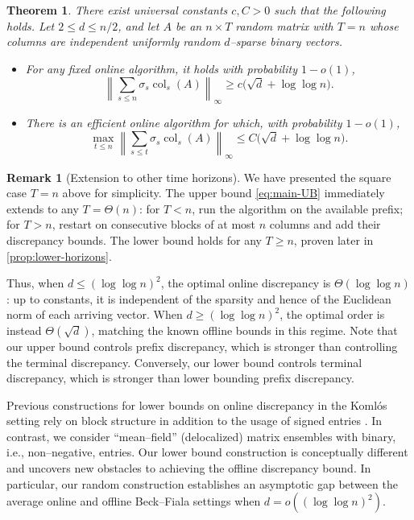 \documentclass[reqno,english]{amsart}
\newcommand*{\col}{\operatorname{col}}
\newtheorem{theorem}{Theorem}[section]
\theoremstyle{definition}
\newtheorem{remark}[remark]{Remark}
\begin{document}
\begin{theorem}\label{thm:main}
There exist universal constants $c,C > 0$ such that the following holds. Let $2\le d\le n/2$, and let $A$ be an $n\times T$ random matrix with $T = n$ whose columns are
independent uniformly random $d$--sparse binary vectors.
\begin{itemize}
    \item For any fixed online algorithm, it holds with probability $1-o(1)$,
    \begin{equation}\label{eq:main-LB}
        \left\|\sum_{s\le n}\sigma_s\col_s(A)\right\|_\infty
        \ge c\big(\sqrt d+\log\log n\big).
    \end{equation}
    \item There is an efficient online algorithm for which, with probability
    $1-o(1)$,
    \begin{equation}\label{eq:main-UB}
        \max_{t\le n}\left\|\sum_{s\le t}\sigma_s\col_s(A)\right\|_\infty
        \le C\big(\sqrt d+\log\log n\big).
    \end{equation}
\end{itemize}
\end{theorem}

\begin{remark}[Extension to other time horizons]
We have presented the square case $T = n$ above for simplicity. The upper bound \eqref{eq:main-UB} immediately extends to any $T=\Theta(n)$:
for $T<n$, run the algorithm on the available prefix; for $T>n$, restart
on consecutive blocks of at most $n$ columns and add their discrepancy
bounds. The lower bound holds for any $T \ge n$, proven later in \cref{prop:lower-horizons}.
\end{remark}

Thus, when
$d\le(\log\log n)^2$, the optimal online discrepancy is
$\Theta(\log\log n)$: up to constants, it is independent of the sparsity and
hence of the Euclidean norm of each arriving vector.  When
$d\ge(\log\log n)^2$, the optimal order is instead $\Theta(\sqrt d)$, matching the known offline bounds in this regime. Note that our upper bound controls prefix discrepancy, which is stronger than controlling the terminal discrepancy. Conversely, our lower bound controls terminal discrepancy, which is stronger than lower bounding prefix discrepancy. 

Previous constructions for lower bounds on online discrepancy in the Koml\'os setting rely on block structure in addition to the usage of signed entries \cite{optimal-online}. In contrast, we consider ``mean--field'' (delocalized) matrix ensembles with binary, i.e., non--negative, entries. Our lower bound construction is conceptually different and uncovers new obstacles to achieving the offline discrepancy bound. In particular, our random construction establishes an asymptotic gap between the average online and offline Beck--Fiala settings when $d=o((\log\log n)^2)$.
\end{document}
